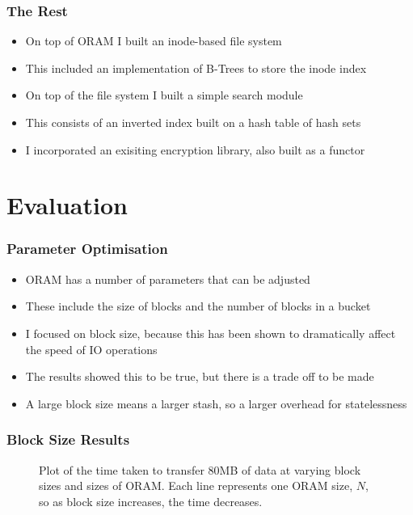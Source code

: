 \documentclass{beamer}
\begin{document}
\begin{frame}
    \frametitle{The Rest}
    \begin{itemize}
        \item On top of ORAM I built an inode-based file system
        \item This included an implementation of B-Trees to store the inode index
        \item On top of the file system I built a simple search module
        \item This consists of an inverted index built on a hash table of hash sets
        \item I incorporated an exisiting encryption library, also built as a functor
    \end{itemize}
\end{frame}

\section{Evaluation}

\begin{frame}
    \frametitle{Parameter Optimisation}
    \begin{itemize}
        \item ORAM has a number of parameters that can be adjusted
        \item These include the size of blocks and the number of blocks in a bucket
        \item I focused on block size, because this has been shown to dramatically affect the speed of IO operations
        \item The results showed this to be true, but there is a trade off to be made
        \item A large block size means a larger stash, so a larger overhead for statelessness
    \end{itemize}
\end{frame}

\begin{frame}
    \frametitle{Block Size Results}
    \begin{figure}
    \centering
    \scalebox{0.6}{}
    \caption{Plot of the time taken to transfer 80MB of data at varying block sizes and sizes of ORAM. Each line represents one ORAM size, $N$, so as block size increases, the time decreases.}
    \label{fig:blockSizeResults}
    \end{figure}
\end{frame}
\end{document}
